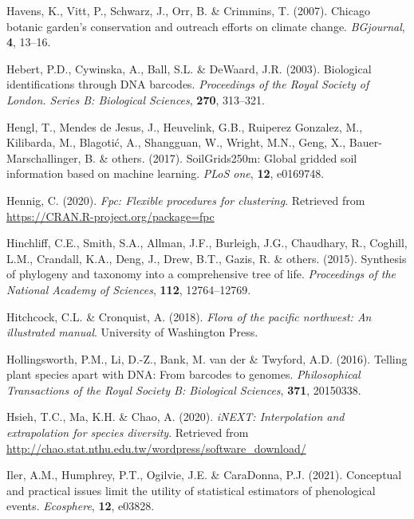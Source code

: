 \documentclass[
]{article}
\newlength{\cslhangindent}
\newlength{\cslentryspacingunit} %
\newenvironment{CSLReferences}[2] %
 {%
  \setlength{\parindent}{0pt}
  \ifodd #1
  \let\oldpar\par
  \def\par{\hangindent=\cslhangindent\oldpar}
  \fi
  \setlength{\parskip}{#2\cslentryspacingunit}
 }%
 {}
\begin{document}
\begin{CSLReferences}{1}{0}
\leavevmode{}%
Havens, K., Vitt, P., Schwarz, J., Orr, B. \& Crimmins, T. (2007).
Chicago botanic garden's conservation and outreach efforts on climate
change. \emph{BGjournal}, \textbf{4}, 13--16.

\leavevmode{}%
Hebert, P.D., Cywinska, A., Ball, S.L. \& DeWaard, J.R. (2003).
Biological identifications through DNA barcodes. \emph{Proceedings of
the Royal Society of London. Series B: Biological Sciences},
\textbf{270}, 313--321.

\leavevmode{}%
Hengl, T., Mendes de Jesus, J., Heuvelink, G.B., Ruiperez Gonzalez, M.,
Kilibarda, M., Blagotić, A., Shangguan, W., Wright, M.N., Geng, X.,
Bauer-Marschallinger, B. \& others. (2017). SoilGrids250m: Global
gridded soil information based on machine learning. \emph{PLoS one},
\textbf{12}, e0169748.

\leavevmode{}%
Hennig, C. (2020). \emph{Fpc: Flexible procedures for clustering}.
Retrieved from \url{https://CRAN.R-project.org/package=fpc}

\leavevmode{}%
Hinchliff, C.E., Smith, S.A., Allman, J.F., Burleigh, J.G., Chaudhary,
R., Coghill, L.M., Crandall, K.A., Deng, J., Drew, B.T., Gazis, R. \&
others. (2015). Synthesis of phylogeny and taxonomy into a comprehensive
tree of life. \emph{Proceedings of the National Academy of Sciences},
\textbf{112}, 12764--12769.

\leavevmode{}%
Hitchcock, C.L. \& Cronquist, A. (2018). \emph{Flora of the pacific
northwest: An illustrated manual}. University of Washington Press.

\leavevmode{}%
Hollingsworth, P.M., Li, D.-Z., Bank, M. van der \& Twyford, A.D.
(2016). Telling plant species apart with DNA: From barcodes to genomes.
\emph{Philosophical Transactions of the Royal Society B: Biological
Sciences}, \textbf{371}, 20150338.

\leavevmode{}%
Hsieh, T.C., Ma, K.H. \& Chao, A. (2020). \emph{iNEXT: Interpolation and
extrapolation for species diversity}. Retrieved from
\url{http://chao.stat.nthu.edu.tw/wordpress/software_download/}

\leavevmode{}%
Iler, A.M., Humphrey, P.T., Ogilvie, J.E. \& CaraDonna, P.J. (2021).
Conceptual and practical issues limit the utility of statistical
estimators of phenological events. \emph{Ecosphere}, \textbf{12},
e03828.


\end{CSLReferences}
\end{document}
